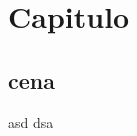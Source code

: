 \documentclass[main.tex]{subfiles}
\begin{document}
\chapter{Capitulo}

\section{cena}
\newpage
asd
\newpage
dsa
\end{document}
